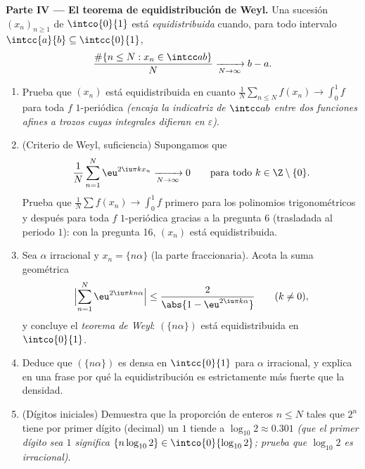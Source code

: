 \begin{problem}
\medskip
\noindent\textbf{Parte IV --- El teorema de equidistribución de
Weyl.} Una sucesión $(x_n)_{n\geq1}$ de $\intco{0}{1}$ está
\emph{equidistribuida} cuando, para todo intervalo $\intcc{a}{b}
\subseteq \intcc{0}{1}$,
\[
\frac{\#\{n \leq N : x_n \in \intcc ab\}}{N}
\xrightarrow[N\to\infty]{} b - a .
\]
\begin{enumerate}[resume]
  \item Prueba que $(x_n)$ está equidistribuida en cuanto
        $\frac1N\sum_{n\leq N}f(x_n) \to \int_0^1 f$ para toda $f$
        $1$-periódica \emph{} \emph{(encaja la indicatriz
        de $\intcc ab$ entre dos funciones  afines a trozos
        cuyas integrales difieran en $\varepsilon$)}.
  \item (Criterio de Weyl, suficiencia) Supongamos que
        \[
        \frac{1}{N}\sum_{n=1}^{N}\eu^{2\iu\pi kx_n}
        \xrightarrow[N\to\infty]{} 0
        \qquad\text{para todo } k \in \Z\setminus\{0\} .
        \]
        Prueba que $\frac1N\sum f(x_n) \to \int_0^1f$ primero para
        los polinomios trigonométricos y después para toda $f$
        $1$-periódica  gracias a la pregunta 6 (trasladada
        al periodo $1$): con la pregunta 16, $(x_n)$ está
        equidistribuida.
  \item Sea $\alpha$ irracional y $x_n = \{n\alpha\}$ (la parte
        fraccionaria). Acota la suma geométrica
        \[
        \Bigl|\sum_{n=1}^{N}\eu^{2\iu\pi kn\alpha}\Bigr|
        \leq \frac{2}{\abs{1 - \eu^{2\iu\pi k\alpha}}}
        \qquad (k \neq 0),
        \]
        y concluye el \emph{teorema de Weyl}: $(\{n\alpha\})$ está
        equidistribuida en $\intco{0}{1}$.
  \item Deduce que $(\{n\alpha\})$ es densa en $\intcc{0}{1}$ para
        $\alpha$ irracional, y explica en una frase por qué la
        equidistribución es estrictamente más fuerte que la
        densidad.
  \item (Dígitos iniciales) Demuestra que la proporción de enteros
        $n \leq N$ tales que $2^n$ tiene por primer dígito (decimal)
        un $1$ tiende a $\log_{10}2 \approx 0.301$ \emph{(que el
        primer dígito sea $1$ significa $\{n\log_{10}2\} \in
        \intco{0}{\log_{10}2}$; prueba que $\log_{10}2$ es
        irracional)}.
\end{enumerate}


\end{problem}
